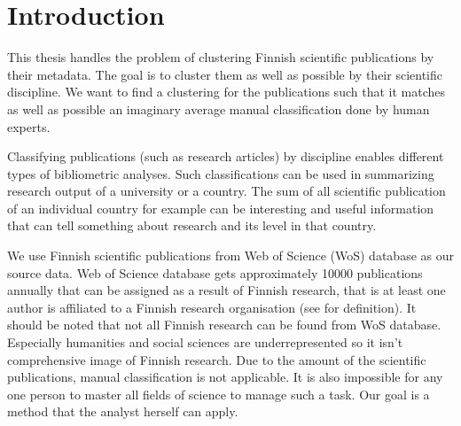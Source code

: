 \chapter{Introduction}
\label{chapter:intro}
This thesis handles the problem of clustering Finnish scientific 
publications by their metadata. The goal is to cluster 
them as well as possible by their scientific discipline. We want 
to find a clustering for the publications such that it matches 
as well as possible an imaginary average manual classification 
done by human experts.

Classifying publications (such as research articles) by discipline 
enables different types of bibliometric analyses. Such 
classifications can be used in summarizing research output of a 
university or a country. The sum of all scientific publication of 
an individual country for example can be interesting and useful 
information that can tell something about research and its level 
in that country.

We use Finnish scientific publications from  Web of Science (WoS)
database as our source data. 
Web of Science database gets approximately 10000 publications 
annually that can be assigned as a result of Finnish research, that
is at least one author is affiliated to a Finnish research 
organisation (see \cite{auranen_tieteen_2018} for definition).
It should be noted that not all Finnish research can be found from
WoS database. Especially humanities and social sciences are 
underrepresented so it isn't comprehensive image of Finnish 
research.
Due to the amount of the scientific publications, manual 
classification is not applicable. It is also impossible for any 
one person to master all fields of science to manage such a
task. Our goal is a method that the analyst herself can apply.

